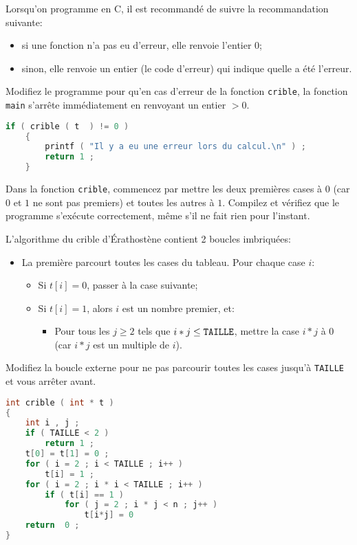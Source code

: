 \question Lorsqu'on programme en C, il est recommandé de suivre la
recommandation suivante:
\begin{itemize}
\item si une fonction n'a pas eu d'erreur, elle renvoie l'entier 0;
\item sinon, elle renvoie un entier (le code d'erreur) qui indique
  quelle a été l'erreur.
\end{itemize}
Modifiez le programme pour qu'en cas d'erreur de la fonction
\texttt{crible}, la fonction \texttt{main} s'arrête immédiatement en
renvoyant un entier \(> 0\).
\begin{solutioncachee}
  \begin{lstlisting}[language=C]
    if ( crible ( t  ) != 0 )
    {
        printf ( "Il y a eu une erreur lors du calcul.\n" ) ;
        return 1 ;
    }
  \end{lstlisting}
\end{solutioncachee}

\question Dans la fonction \texttt{crible}, commencez par mettre les
deux premières cases à \(0\) (car \(0\) et \(1\) ne sont pas premiers)
et toutes les autres à \(1\). Compilez et vérifiez que le programme
s'exécute correctement, même s'il ne fait rien pour l'instant.

\question L'algorithme du crible d'Érathostène contient 2 boucles imbriquées:
\begin{itemize}
\item La première parcourt toutes les cases du tableau. Pour chaque case \(i\):
  \begin{itemize}
  \item Si \(t[i]=0\), passer à la case suivante;
  \item Si \(t[i]=1\), alors \(i\) est un nombre premier, et:
    \begin{itemize}
    \item Pour tous les \(j\ge 2\) tels que \(i*j\le \text{\tt TAILLE}\), mettre
      la case \(i*j\) à 0 (car \(i*j\) est un multiple de \(i\)).
    \end{itemize}
  \end{itemize}
\end{itemize}

\question Modifiez la boucle externe pour ne pas parcourir toutes les
cases jusqu'à \texttt{TAILLE} et vous arrêter avant. 

\begin{solutioncachee}
  \begin{lstlisting}[language=C]
int crible ( int * t )
{
    int i , j ;
    if ( TAILLE < 2 )
        return 1 ;
    t[0] = t[1] = 0 ;
    for ( i = 2 ; i < TAILLE ; i++ )
        t[i] = 1 ;
    for ( i = 2 ; i * i < TAILLE ; i++ )
        if ( t[i] == 1 )
            for ( j = 2 ; i * j < n ; j++ )
                t[i*j] = 0
    return  0 ;
}    
  \end{lstlisting}
\end{solutioncachee}

